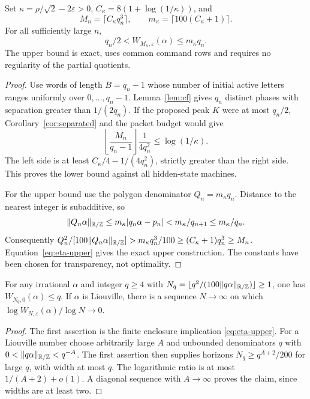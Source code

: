\begin{theorem}\label{thm:cubic-scales}
Set $\kappa=\rho/\sqrt2-2\varepsilon>0$, $C_\kappa=8(1+\log(1/\kappa))$, and
\[
 M_n=\lceil C_\kappa q_n^3\rceil,\qquad
 m_\kappa=\lceil100(C_\kappa+1)\rceil.
\]
For all sufficiently large $n$,
\begin{equation}\label{eq:cubic-scales}
               q_n/2<W_{M_n,\varepsilon}(\alpha)\le m_\kappa q_n.
\end{equation}
The upper bound is exact, uses common command rows and requires no regularity of the partial quotients.
\end{theorem}
\begin{proof}
Use words of length $B=q_n-1$ whose number of initial active letters ranges uniformly over $0,\ldots,q_n-1$. Lemma~\ref{lem:cf} gives $q_n$ distinct phases with separation greater than $1/(2q_n)$. If the proposed peak $K$ were at most $q_n/2$, Corollary~\ref{cor:separated} and the packet budget would give
\[
 \left\lfloor\frac{M_n}{q_n-1}\right\rfloor\frac1{4q_n^2}
                           \le\log(1/\kappa).
\]
The left side is at least $C_\kappa/4-1/(4q_n^2)$, strictly greater than the right side. This proves the lower bound against all hidden-state machines.

For the upper bound use the polygon denominator $Q_n=m_\kappa q_n$. Distance to the nearest integer is subadditive, so
\[
 \lVert Q_n\alpha\rVert_{\mathbb R/\mathbb Z}
 \le m_\kappa|q_n\alpha-p_n|<m_\kappa/q_{n+1}\le m_\kappa/q_n.
\]
Consequently
$Q_n^2/[100\lVert Q_n\alpha\rVert_{\mathbb R/\mathbb Z}]>m_\kappa q_n^3/100
\ge(C_\kappa+1)q_n^3\ge M_n$.
Equation~\eqref{eq:eta-upper} gives the exact upper construction. The constants have been chosen for transparency, not optimality.
\end{proof}

\begin{proposition}\label{prop:resonant-horizons}
For any irrational $\alpha$ and integer $q\ge4$ with
$N_q=\lfloor q^2/(100\lVert q\alpha\rVert_{\mathbb R/\mathbb Z})\rfloor\ge1$, one has $W_{N_q,0}(\alpha)\le q$. If $\alpha$ is Liouville, there is a sequence $N\to\infty$ on which
$\log W_{N,\varepsilon}(\alpha)/\log N\to0$.
\end{proposition}
\begin{proof}
The first assertion is the finite enclosure implication \eqref{eq:eta-upper}. For a Liouville number choose arbitrarily large $A$ and unbounded denominators $q$ with
$0<\lVert q\alpha\rVert_{\mathbb R/\mathbb Z}<q^{-A}$. The first assertion then supplies horizons $N_q\ge q^{A+2}/200$ for large $q$, with width at most $q$. The logarithmic ratio is at most $1/(A+2)+o(1)$. A diagonal sequence with $A\to\infty$ proves the claim, since widths are at least two.
\end{proof}

